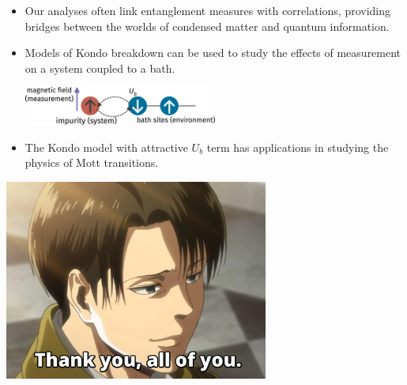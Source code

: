 \documentclass[aspectratio=169]{beamer}
\begin{document}
\begin{frame}{}
	\begin{itemize}
	\item Our analyses often link entanglement measures with correlations, providing bridges between the worlds of condensed matter and quantum information.\\[10pt]
	\item Models of Kondo breakdown can be used to study the effects of measurement on a system coupled to a bath.\\[10pt]
	\begin{center}
	\includegraphics[width=0.5\textwidth]{measurement.pdf}
	\end{center}
	\item The Kondo model with attractive \(U_b\) term has applications in studying the physics of Mott transitions.
\end{itemize}
\end{frame}

\begin{frame}
	\includegraphics[width=0.65\textwidth]{thanks.pdf}
\end{frame}
\end{document}
